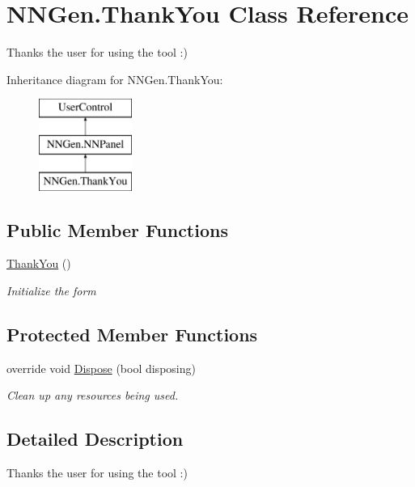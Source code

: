 \hypertarget{class_n_n_gen_1_1_thank_you}{}\section{N\+N\+Gen.\+Thank\+You Class Reference}
\label{class_n_n_gen_1_1_thank_you}


Thanks the user for using the tool \+:)  


Inheritance diagram for N\+N\+Gen.\+Thank\+You\+:\begin{figure}[H]
\begin{center}
\leavevmode
\includegraphics[height=3.000000cm]{class_n_n_gen_1_1_thank_you}
\end{center}
\end{figure}
\subsection*{Public Member Functions}
\begin{DoxyCompactItemize}
\item 
\hyperlink{class_n_n_gen_1_1_thank_you_a9b523a901e4d1d292cd7b47c18522b45}{Thank\+You} ()
\begin{DoxyCompactList}\small\item\em Initialize the form \end{DoxyCompactList}\end{DoxyCompactItemize}
\subsection*{Protected Member Functions}
\begin{DoxyCompactItemize}
\item 
override void \hyperlink{class_n_n_gen_1_1_thank_you_aa7cea980c28cc33b6df11e987cd3a3e3}{Dispose} (bool disposing)
\begin{DoxyCompactList}\small\item\em Clean up any resources being used. \end{DoxyCompactList}\end{DoxyCompactItemize}


\subsection{Detailed Description}
Thanks the user for using the tool \+:) 




